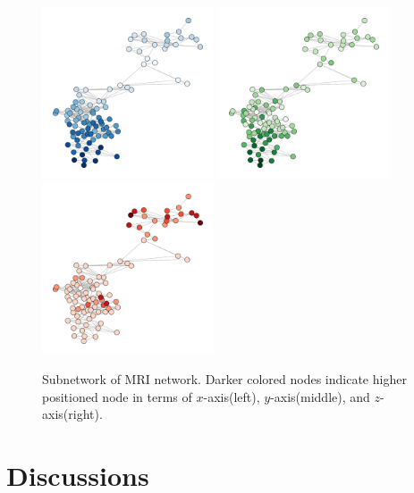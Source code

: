 \documentclass[12pt]{article}
\theoremstyle{definition}
\begin{document}
\begin{figure}[H]
	\centering
		\label{fig:mri}
		\includegraphics[width=2in]{../Figure/brain1_x.pdf}
		\includegraphics[width=2in]{../Figure/brain1_y.pdf}
		\includegraphics[width=2in]{../Figure/brain1_z.pdf}
	\caption{Subnetwork of MRI network. Darker colored nodes indicate higher positioned node in terms of $x$-axis(left), $y$-axis(middle), and $z$-axis(right).}
\end{figure}
	
	
\section{Discussions}
\label{sec:discussion}
	
\end{document}
